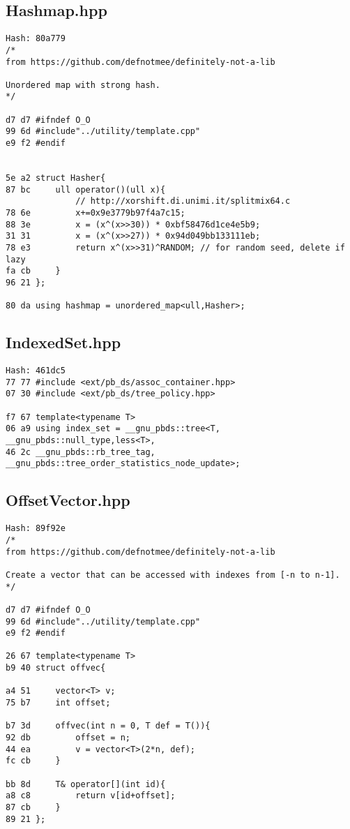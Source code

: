 \documentclass[11pt, a4paper, twoside]{article}
\begin{document}
\subsection{Hashmap.hpp}
\begin{lstlisting}
Hash: 80a779
/*
from https://github.com/defnotmee/definitely-not-a-lib

Unordered map with strong hash.
*/

d7 d7 #ifndef O_O
99 6d #include"../utility/template.cpp"
e9 f2 #endif


5e a2 struct Hasher{
87 bc     ull operator()(ull x){
              // http://xorshift.di.unimi.it/splitmix64.c
78 6e         x+=0x9e3779b97f4a7c15;
88 3e         x = (x^(x>>30)) * 0xbf58476d1ce4e5b9;
31 31         x = (x^(x>>27)) * 0x94d049bb133111eb;
78 e3         return x^(x>>31)^RANDOM; // for random seed, delete if lazy
fa cb     }
96 21 };

80 da using hashmap = unordered_map<ull,Hasher>;
\end{lstlisting}

\subsection{IndexedSet.hpp}
\begin{lstlisting}
Hash: 461dc5
77 77 #include <ext/pb_ds/assoc_container.hpp> 
07 30 #include <ext/pb_ds/tree_policy.hpp> 

f7 67 template<typename T>
06 a9 using index_set = __gnu_pbds::tree<T, __gnu_pbds::null_type,less<T>, 
46 2c __gnu_pbds::rb_tree_tag, __gnu_pbds::tree_order_statistics_node_update>;
\end{lstlisting}

\subsection{OffsetVector.hpp}
\begin{lstlisting}
Hash: 89f92e
/*
from https://github.com/defnotmee/definitely-not-a-lib

Create a vector that can be accessed with indexes from [-n to n-1].
*/

d7 d7 #ifndef O_O
99 6d #include"../utility/template.cpp"
e9 f2 #endif

26 67 template<typename T>
b9 40 struct offvec{
      
a4 51     vector<T> v;
75 b7     int offset;
      
b7 3d     offvec(int n = 0, T def = T()){
92 db         offset = n;
44 ea         v = vector<T>(2*n, def);
fc cb     }
      
bb 8d     T& operator[](int id){
a8 c8         return v[id+offset];
87 cb     }
89 21 };
\end{lstlisting}
\end{document}
